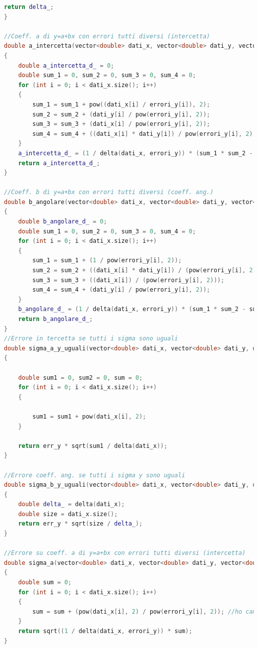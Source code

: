 \documentclass[a4paper,11pt,oneside]{article}
\begin{document}
\begin{lstlisting}[language=C++, label=lst:statistica.h, caption=statistica.h]
    return delta_;
}

//Coeff. a di y=a+bx con errori tutti diversi (intercetta)
double a_intercetta(vector<double> dati_x, vector<double> dati_y, vector<double> errori_y)
{
    double a_intercetta_d_ = 0;
    double sum_1 = 0, sum_2 = 0, sum_3 = 0, sum_4 = 0;
    for (int i = 0; i < dati_x.size(); i++)
    {
        sum_1 = sum_1 + pow((dati_x[i] / errori_y[i]), 2);
        sum_2 = sum_2 + (dati_y[i] / pow(errori_y[i], 2));
        sum_3 = sum_3 + (dati_x[i] / pow(errori_y[i], 2));
        sum_4 = sum_4 + ((dati_x[i] * dati_y[i]) / pow(errori_y[i], 2));
    }
    a_intercetta_d_ = (1 / delta(dati_x, errori_y)) * (sum_1 * sum_2 - sum_3 * sum_4);
    return a_intercetta_d_;
}

//Coeff. b di y=a+bx con errori tutti diversi (coeff. ang.)
double b_angolare(vector<double> dati_x, vector<double> dati_y, vector<double> errori_y)
{
    double b_angolare_d_ = 0;
    double sum_1 = 0, sum_2 = 0, sum_3 = 0, sum_4 = 0;
    for (int i = 0; i < dati_x.size(); i++)
    {
        sum_1 = sum_1 + (1 / pow(errori_y[i], 2));
        sum_2 = sum_2 + ((dati_x[i] * dati_y[i]) / (pow(errori_y[i], 2)));
        sum_3 = sum_3 + ((dati_x[i]) / (pow(errori_y[i], 2)));
        sum_4 = sum_4 + (dati_y[i] / pow(errori_y[i], 2));
    }
    b_angolare_d_ = (1 / delta(dati_x, errori_y)) * (sum_1 * sum_2 - sum_3 * sum_4);
    return b_angolare_d_;
}
//Errore in tercetta se tutti i sigma sono uguali
double sigma_a_y_uguali(vector<double> dati_x, vector<double> dati_y, double err_y)
{

    double sum1 = 0, sum2 = 0, sum = 0;
    for (int i = 0; i < dati_x.size(); i++)
    {

        sum1 = sum1 + pow(dati_x[i], 2);
    }

    return err_y * sqrt(sum1 / delta(dati_x));
}

//Errore coeff. ang. se tutti i sigma y sono uguali
double sigma_b_y_uguali(vector<double> dati_x, vector<double> dati_y, double err_y)
{
    double delta_ = delta(dati_x);
    double size = dati_x.size();
    return err_y * sqrt(size / delta_);
}

//Errore su coeff. a di y=a+bx con errori tutti diversi (intercetta)
double sigma_a(vector<double> dati_x, vector<double> dati_y, vector<double> errori_y)
{
    double sum = 0;
    for (int i = 0; i < dati_x.size(); i++)
    {
        sum = sum + (pow(dati_x[i], 2) / pow(errori_y[i], 2)); //ho cambiato FABIO
    }
    return sqrt((1 / delta(dati_x, errori_y)) * sum);
}


\end{lstlisting}
\end{document}
